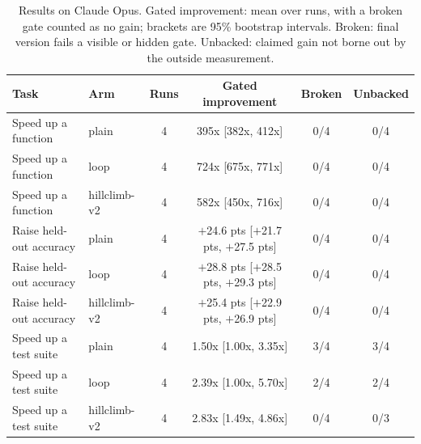 \begin{table}[t]\centering\small\setlength{\tabcolsep}{3pt}
\caption{Results on Claude Opus. Gated improvement: mean over runs, with a broken gate counted as no gain; brackets are 95\% bootstrap intervals. Broken: final version fails a visible or hidden gate. Unbacked: claimed gain not borne out by the outside measurement.}
\label{tab:opus}
\begin{tabular}{llcccc}\toprule
Task & Arm & Runs & Gated improvement & Broken & Unbacked \\\midrule
Speed up a function & plain & 4 & 395x [382x, 412x] & 0/4 & 0/4 \\
Speed up a function & loop & 4 & 724x [675x, 771x] & 0/4 & 0/4 \\
Speed up a function & hillclimb-v2 & 4 & 582x [450x, 716x] & 0/4 & 0/4 \\
\midrule
Raise held-out accuracy & plain & 4 & $+$24.6 pts [$+$21.7 pts, $+$27.5 pts] & 0/4 & 0/4 \\
Raise held-out accuracy & loop & 4 & $+$28.8 pts [$+$28.5 pts, $+$29.3 pts] & 0/4 & 0/4 \\
Raise held-out accuracy & hillclimb-v2 & 4 & $+$25.4 pts [$+$22.9 pts, $+$26.9 pts] & 0/4 & 0/4 \\
\midrule
Speed up a test suite & plain & 4 & 1.50x [1.00x, 3.35x] & 3/4 & 3/4 \\
Speed up a test suite & loop & 4 & 2.39x [1.00x, 5.70x] & 2/4 & 2/4 \\
Speed up a test suite & hillclimb-v2 & 4 & 2.83x [1.49x, 4.86x] & 0/4 & 0/3 \\
\bottomrule\end{tabular}\end{table}
